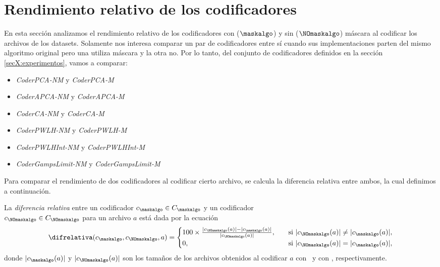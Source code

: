 \clearpage











\section{Rendimiento relativo de los codificadores}
\label{secX:rendimiento-relativo}

En esta sección analizamos el rendimiento relativo de los codificadores con ($\maskalgo$) y sin ($\NOmaskalgo$) máscara al codificar los archivos de los datasets. Solamente nos interesa comparar un par de codificadores entre sí cuando sus implementaciones parten del mismo algoritmo original pero una utiliza máscara y la otra no. Por lo tanto, del conjunto de codificadores definidos en la sección \ref{secX:experimentos}, vamos a comparar:

\vspace{-8pt}
\begin{itemize}
    \item \textit{CoderPCA-NM} y \textit{CoderPCA-M}
    \item \textit{CoderAPCA-NM} y \textit{CoderAPCA-M}
    \item \textit{CoderCA-NM} y \textit{CoderCA-M}
    \item \textit{CoderPWLH-NM} y \textit{CoderPWLH-M}
    \item \textit{CoderPWLHInt-NM} y \textit{CoderPWLHInt-M}
    \item \textit{CoderGampsLimit-NM} y \textit{CoderGampsLimit-M}
\end{itemize}

Para comparar el rendimiento de dos codificadores al codificar cierto archivo, se calcula la diferencia relativa entre ambos, la cual definimos a continuación.

\begin{defcion}
La \textit{diferencia relativa} entre un codificador $c_\maskalgo \in C_\maskalgo$ y un codificador\\$c_\NOmaskalgo \in C_\NOmaskalgo$ para un archivo $a$ está dada por la ecuación
\begin{equation}
\label{eq:diferencia-relativa}
\difrelativa(c_\maskalgo, c_\NOmaskalgo, a)  =
\begin{cases}
100\times\frac{|c_\NOmaskalgo (a)| - |c_\maskalgo (a)|}{ |c_\NOmaskalgo (a)| }, \quad & \text{si } |c_\NOmaskalgo (a)| \ne |c_\maskalgo (a)|, \\
0,                   & \text{si } |c_\NOmaskalgo (a)| = |c_\maskalgo (a)|,
\end{cases}
\end{equation}
donde $|c_\maskalgo(a)|$ y $|c_\NOmaskalgo(a)|$ son los tamaños de los archivos obtenidos al codificar $a$ con \cmaskalgo \ y con \cNOmaskalgo, respectivamente. 
\end{defcion}


